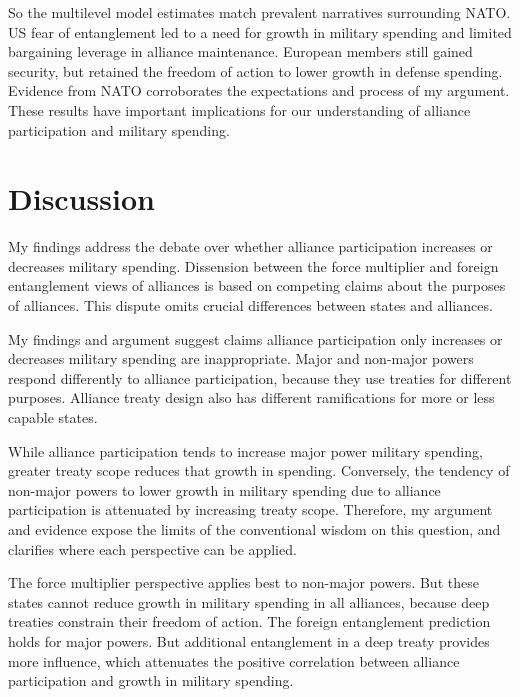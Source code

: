 \documentclass[12pt]{article}
\begin{document}
So the multilevel model estimates match prevalent narratives surrounding NATO.
US fear of entanglement led to a need for growth in military spending and limited bargaining leverage in alliance maintenance. 
European members still gained security, but retained the freedom of action to lower growth in defense spending.   
Evidence from NATO corroborates the expectations and process of my argument. 
These results have important implications for our understanding of alliance participation and military spending. 


\section{Discussion}


My findings address the debate over whether alliance participation increases or decreases military spending. 
Dissension between the force multiplier and foreign entanglement views of alliances is based on competing claims about the purposes of alliances. 
This dispute omits crucial differences between states and alliances. 


My findings and argument suggest claims alliance participation only increases or decreases military spending are inappropriate. 
Major and non-major powers respond differently to alliance participation, because they use treaties for different purposes. 
Alliance treaty design also has different ramifications for more or less capable states. 


While alliance participation tends to increase major power military spending, greater treaty scope reduces that growth in spending. 
Conversely, the tendency of non-major powers to lower growth in military spending due to alliance participation is attenuated by increasing treaty scope. 
Therefore, my argument and evidence expose the limits of the conventional wisdom on this question, and clarifies where each perspective can be applied. 


The force multiplier perspective applies best to non-major powers. 
But these states cannot reduce growth in military spending in all alliances, because deep treaties constrain their freedom of action.
The foreign entanglement prediction holds for major powers. 
But additional entanglement in a deep treaty provides more influence, which attenuates the positive correlation between alliance participation and growth in military spending. 
\end{document}
